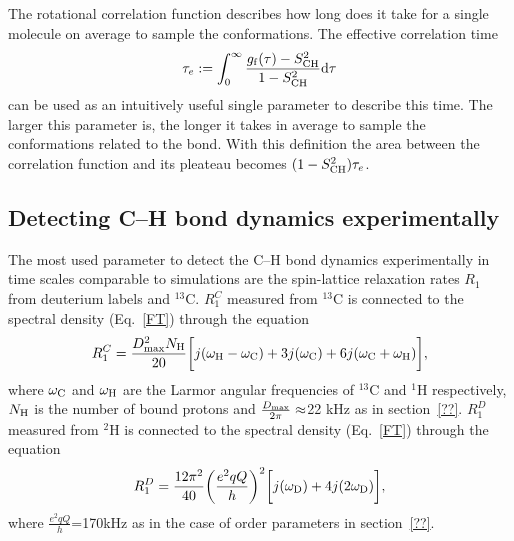 \documentclass[aps,prl,superscriptaddress,twocolumn]{revtex4}
\begin{document}
The rotational correlation function describes how long does it take for a single molecule
on average to sample the conformations. The effective correlation time 
\begin{equation}\label{effCTdef}
\tau_{e}:=\int_0^{\infty} \frac{g_{\rm{f}}(\tau)-S_{\rm{CH}}^2}{1-S_{\rm{CH}}^2} \mathrm{d}\tau
\end{equation} 
can be used as an intuitively useful single parameter to describe this time. 
The larger this parameter is, the longer it takes in average to sample the conformations related to the
bond. With this definition the area between the correlation function and its pleateau becomes $(1-S_{\rm{CH}}^2)\tau_{e}$.

\subsection{Detecting C--H bond dynamics experimentally}

The most used parameter to detect the C--H bond dynamics experimentally in time scales comparable to simulations
are the spin-lattice relaxation rates $R_1$ from deuterium labels and $^{13}$C. 
$R_1^{C}$ measured from $^{13}$C is connected to the spectral density (Eq.~\ref{FT}) through the equation
\begin{equation}\label{R1C}
R_{1}^{C}=\frac{D_{\rm{max}}^2N_{\rm{H}}}{20}\bigg[j(\omega_{\rm{H}}-\omega_{\rm{C}})+3j(\omega_{\rm{C}})+6j(\omega_{\rm{C}}+\omega_{\rm{H}})\bigg],
\end{equation}
where $\omega_{\rm{C}}$ and $\omega_{\rm{H}}$ are the Larmor angular frequencies of $^{13}$C and $^1$H respectively, 
$N_{\rm{H}}$ is the number of bound protons and $\frac{D_{\rm{max}}}{2\pi}\approx$22 kHz as in section~\ref{??}.
$R_1^{D}$ measured from $^2$H is connected to the spectral density (Eq.~\ref{FT}) through the equation
\begin{equation}\label{R1C}
R_{1}^{D}=\frac{12\pi^2}{40}\bigg(\frac{e^2qQ}{h}\bigg)^2\bigg[j(\omega_{\rm{D}})+4j(2\omega_{\rm{D}})\bigg],
\end{equation}
where $\frac{e^2qQ}{h}$=170kHz as in the case of order parameters in section~\ref{??}.
\end{document}

